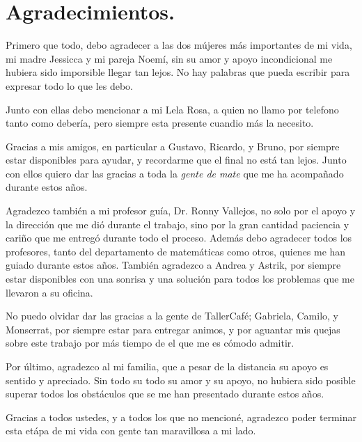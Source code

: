 \chapter*{Agradecimientos.}

Primero que todo, debo agradecer a las dos m\'ujeres m\'as importantes de mi vida, mi madre Jessicca y mi pareja Noem\'i, sin su amor y apoyo incondicional me hubiera sido imporsible llegar tan lejos. No hay palabras que pueda escribir para expresar todo lo que les debo.

Junto con ellas debo mencionar a mi Lela Rosa, a quien no llamo por telefono tanto como deber\'ia, pero siempre esta presente cuandio m\'as la necesito.

Gracias a mis amigos, en particular a Gustavo, Ricardo, y Bruno, por siempre estar disponibles para ayudar, y recordarme que el final no está tan lejos. Junto con ellos quiero dar las gracias a toda la \textit{gente de mate} que me ha acompa\~nado durante estos a\~nos.

Agradezco tambi\'en a mi profesor gu\'ia, Dr. Ronny Vallejos, no solo por el apoyo y la direcci\'on que me dió durante el trabajo, sino por la gran cantidad paciencia y cariño que me entreg\'o durante todo el proceso. Además debo agradecer todos los profesores, tanto del departamento de matem\'aticas como otros, quienes me han guiado durante estos a\~nos. Tambi\'en agradezco a Andrea y Astrik, por siempre estar disponibles con una sonrisa y una soluci\'on para todos los problemas que me llevaron a su oficina.


No puedo olvidar dar las gracias a la gente de TallerCaf\'e; Gabriela, Camilo, y Monserrat, por siempre estar para entregar animos, y por aguantar mis quejas sobre este trabajo por m\'as tiempo de el que me es c\'omodo admitir.

Por \'ultimo, agradezco al mi familia, que a pesar de la distancia su apoyo es sentido y apreciado. Sin todo su todo su amor y su apoyo, no hubiera sido posible superar todos los obst\'aculos que se me han presentado durante estos a\~nos.

Gracias a todos ustedes, y a todos los que no mencion\'e, agradezco poder terminar esta et\'apa de mi vida con gente tan maravillosa a mi lado.